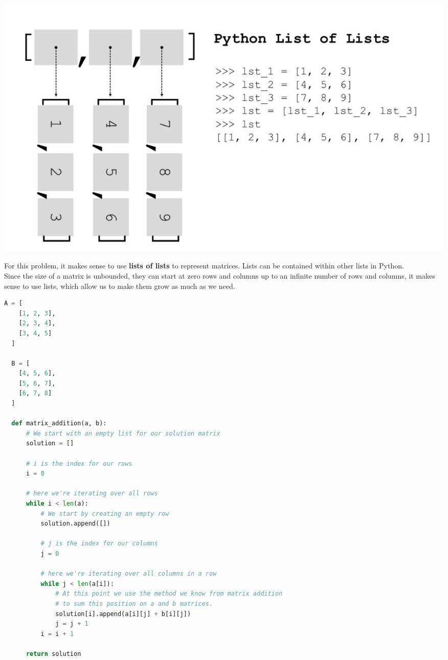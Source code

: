 \documentclass{tufte-handout}
\begin{document}
\begin{marginfigure}%
  \includegraphics[width=\linewidth]{listoflist.jpg}
  \caption{
    For this problem, it makes sense to use \textbf{lists of lists} to represent matrices.
    Lists can be contained within other lists in Python.
    \\
    Since the size of a matrix is unbounded, they can start at zero rows and columns
    up to an infinite number of rows and columns, it makes sense to use lists, which
    allow us to make them grow as much as we need.
  }
  \label{fig:marginfig}
\end{marginfigure}

\begin{lstlisting}[language=Python]
  A = [
    [1, 2, 3],
    [2, 3, 4],
    [3, 4, 5]
  ]
  
  B = [
    [4, 5, 6],
    [5, 6, 7],
    [6, 7, 8]
  ]
  
  def matrix_addition(a, b):
      # We start with an empty list for our solution matrix
      solution = []
  
      # i is the index for our rows
      i = 0

      # here we're iterating over all rows
      while i < len(a):
          # We start by creating an empty row
          solution.append([])
          
          # j is the index for our columns
          j = 0

          # here we're iterating over all columns in a row
          while j < len(a[i]):
              # At this point we use the method we know from matrix addition
              # to sum this position on a and b matrices.
              solution[i].append(a[i][j] + b[i][j])
              j = j + 1
          i = i + 1
  
      return solution
\end{lstlisting}
\end{document}
